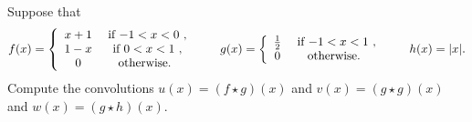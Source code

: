 \documentclass[11pt]{article}
\begin{document}
\begin{exercise}
    Suppose that
    \begin{align*}
        f(x) = \left\{\begin{array}{cc} x+1 & \text{ if $-1 < x < 0$ }, \\  1-x & \text{ if $ 0 < x < 1$ }, \\  0 & \text{ otherwise. } \end{array}\right.
        \qquad 
        g(x) = \left\{\begin{array}{cc} \frac 1 2 & \text{ if $-1 < x < 1$ }, \\ 0 & \text{ otherwise. } \end{array}\right.
        \qquad 
        h(x) = |x|
        .
    \end{align*}
    Compute the convolutions $u(x) = (f \star g)(x)$ and $v(x) = (g \star g)(x)$ and $w(x) = (g \star h)(x)$.
\end{exercise}
\end{document}
